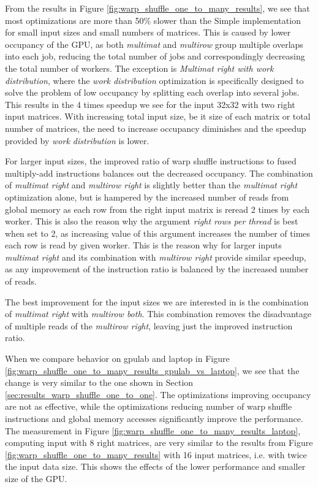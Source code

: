 From the results in Figure \ref{fig:warp_shuffle_one_to_many_results}, we see that most optimizations are more than 50\% slower than the Simple implementation for small input sizes and small numbers of matrices. This is caused by lower occupancy of the GPU, as both \textit{multimat} and \textit{multirow} group multiple overlaps into each job, reducing the total number of jobs and correspondingly decreasing the total number of workers. The exception is \textit{Multimat right with work distribution}, where the \textit{work distribution} optimization is specifically designed to solve the problem of low occupancy by splitting each overlap into several jobs. This results in the 4 times speedup we see for the input 32x32 with two right input matrices. With increasing total input size, be it size of each matrix or total number of matrices, the need to increase occupancy diminishes and the speedup provided by \textit{work distribution} is lower.

For larger input sizes, the improved ratio of warp shuffle instructions to fused multiply-add instructions balances out the decreased occupancy. The combination of \textit{multimat right} and \textit{multirow right} is slightly better than the \textit{multimat right} optimization alone, but is hampered by the increased number of reads from global memory as each row from the right input matrix is reread 2 times by each worker. This is also the reason why the argument \textit{right rows per thread} is best when set to 2, as increasing value of this argument increases the number of times each row is read by given worker. This is the reason why for larger inputs \textit{multimat right} and its combination with \textit{multirow right} provide similar speedup, as any improvement of the instruction ratio is balanced by the increased number of reads.

The best improvement for the input sizes we are interested in is the combination of \textit{multimat right} with \textit{multirow both}. This combination removes the disadvantage of multiple reads of the \textit{multirow right}, leaving just the improved instruction ratio.

When we compare behavior on gpulab and laptop in Figure \ref{fig:warp_shuffle_one_to_many_results_gpulab_vs_laptop}, we see that the change is very similar to the one shown in Section \ref{sec:results_warp_shuffle_one_to_one}. The optimizations improving occupancy are not as effective, while the optimizations reducing number of warp shuffle instructions and global memory accesses significantly improve the performance. The measurement in Figure \ref{fig:warp_shuffle_one_to_many_results_laptop}, computing input with 8 right matrices, are very similar to the results from Figure \ref{fig:warp_shuffle_one_to_many_results} with 16 input matrices, i.e. with twice the input data size. This shows the effects of the lower performance and smaller size of the GPU.


